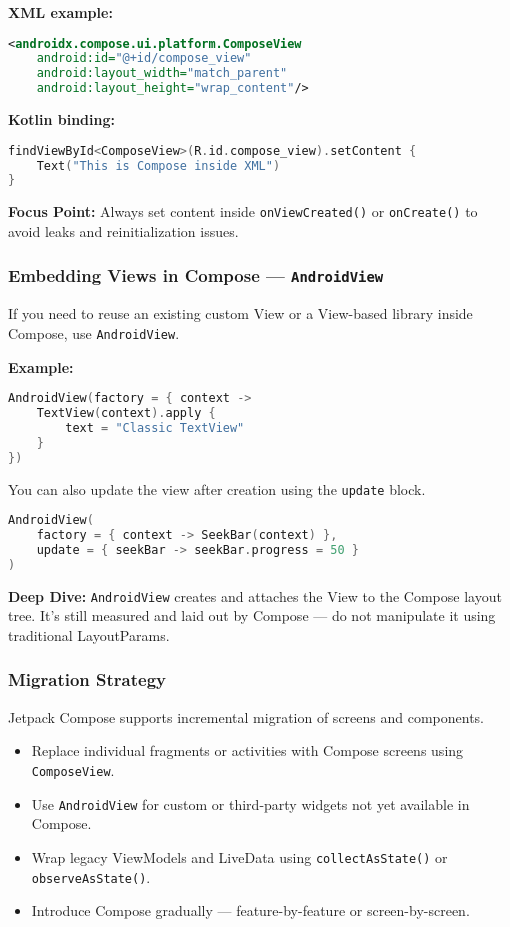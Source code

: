 \documentclass[a4paper,12pt]{article}
\begin{document}
\textbf{XML example:}
\begin{lstlisting}[language=XML]
<androidx.compose.ui.platform.ComposeView
    android:id="@+id/compose_view"
    android:layout_width="match_parent"
    android:layout_height="wrap_content"/>
\end{lstlisting}

\textbf{Kotlin binding:}
\begin{lstlisting}[language=Kotlin]
findViewById<ComposeView>(R.id.compose_view).setContent {
    Text("This is Compose inside XML")
}
\end{lstlisting}

\textbf{Focus Point:} Always set content inside \texttt{onViewCreated()} or \texttt{onCreate()} to avoid leaks and reinitialization issues.

\subsubsection{Embedding Views in Compose — \texttt{AndroidView}}

If you need to reuse an existing custom View or a View-based library inside Compose, use \texttt{AndroidView}.

\textbf{Example:}
\begin{lstlisting}[language=Kotlin]
AndroidView(factory = { context ->
    TextView(context).apply {
        text = "Classic TextView"
    }
})
\end{lstlisting}

You can also update the view after creation using the \texttt{update} block.

\begin{lstlisting}[language=Kotlin]
AndroidView(
    factory = { context -> SeekBar(context) },
    update = { seekBar -> seekBar.progress = 50 }
)
\end{lstlisting}

\textbf{Deep Dive:} \texttt{AndroidView} creates and attaches the View to the Compose layout tree. It's still measured and laid out by Compose — do not manipulate it using traditional LayoutParams.

\subsubsection{Migration Strategy}

Jetpack Compose supports incremental migration of screens and components.

\begin{itemize}
  \item Replace individual fragments or activities with Compose screens using \texttt{ComposeView}.
  \item Use \texttt{AndroidView} for custom or third-party widgets not yet available in Compose.
  \item Wrap legacy ViewModels and LiveData using \texttt{collectAsState()} or \texttt{observeAsState()}.
  \item Introduce Compose gradually — feature-by-feature or screen-by-screen.
\end{itemize}
\end{document}
